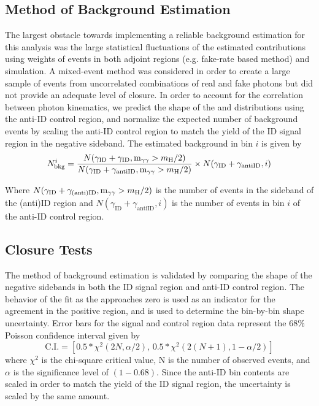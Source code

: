 \subsection{Method of Background Estimation} \label{sec:ana_bkgest}
The largest obstacle towards implementing a reliable background estimation for this analysis was the large statistical fluctuations of the estimated contributions using weights of events in both adjoint regions (e.g. fake-rate based method) and simulation. A mixed-event method was considered in order to create a large sample of events from uncorrelated combinations of real and fake photons but did not provide an adequate level of closure. In order to account for the correlation between photon kinematics, we predict the shape of the \lxy and \mgg distributions using the anti-ID control region, and normalize the expected number of background events by scaling the anti-ID control region to match the yield of the ID signal region in the negative \lxy sideband. The estimated background in bin $i$ is given by
\begin{equation}
	\label{eq:background}
	N_{\mathrm{bkg}}^{i} = \frac{N(\gamma_\mathrm{ID}+\gamma_\mathrm{ID}, \text{m}_{\gamma\gamma} > m_{\mathrm{H}}\space/2)}{N(\gamma_\mathrm{ID}+\gamma_\mathrm{antiID}, \text{m}_{\gamma\gamma} > m_{\mathrm{H}}\space/2)}\times N(\gamma_\mathrm{ID}+\gamma_\mathrm{antiID}, i)
\end{equation}

Where $N(\gamma_\mathrm{ID}+\gamma_\mathrm{(anti)ID}, \text{m}_{\gamma\gamma} > m_{\mathrm{H}}\space/2)$ is the number of events in the \lxy sideband of the (anti)ID region and $N(\gamma_\mathrm{ID}+\gamma_\mathrm{antiID}, i)$ is the number of events in bin $i$ of the anti-ID control region. 

\subsection{Closure Tests} \label{sec:ana_bkgclosure}
The method of background estimation is validated by comparing the shape of the negative \lxy sidebands in both the ID signal region and anti-ID control region. The behavior of the fit as the \lxy approaches zero is used as an indicator for the agreement in the positive \lxy region, and is used to determine the bin-by-bin shape uncertainty. Error bars for the signal and control region data represent the $68\%$ Poisson confidence interval given by
\begin{equation}
	\text{C.I.}=\left[0.5*\chi^2(2N, \alpha/2),\, 0.5*\chi^2(2(N+1), 1-\alpha/2)\right]
\end{equation}
where $\chi^2$ is the chi-square critical value, N is the number of observed events, and $\alpha$ is the significance level of $(1-0.68)$. Since the anti-ID bin contents are scaled in order to match the yield of the ID signal region, the uncertainty is scaled by the same amount.

